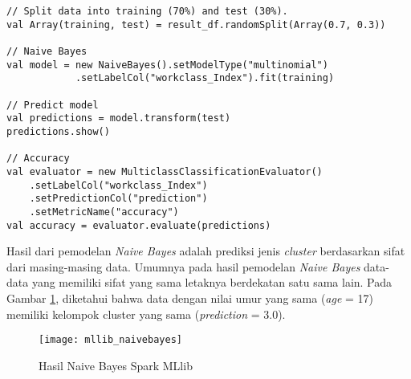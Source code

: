 \begin{lstlisting}[basicstyle=\ttfamily, frame=single,
	columns=fullflexible, keepspaces=true, breaklines=true, label=lst:naivebayes_mllib, caption=Eksperimen Naive Bayes Spark MLlib]
// Split data into training (70%) and test (30%).
val Array(training, test) = result_df.randomSplit(Array(0.7, 0.3))

// Naive Bayes
val model = new NaiveBayes().setModelType("multinomial")
			.setLabelCol("workclass_Index").fit(training)
			
// Predict model
val predictions = model.transform(test)
predictions.show()

// Accuracy
val evaluator = new MulticlassClassificationEvaluator()
	.setLabelCol("workclass_Index")
	.setPredictionCol("prediction")
	.setMetricName("accuracy")
val accuracy = evaluator.evaluate(predictions)

\end{lstlisting}
\newpage
\par Hasil dari pemodelan \textit{Naive Bayes} adalah prediksi jenis \textit{cluster} berdasarkan sifat dari masing-masing data. Umumnya pada hasil pemodelan \textit{Naive Bayes} data-data yang memiliki sifat yang sama letaknya berdekatan satu sama lain. Pada Gambar \ref{fig:mllib_naivebayes}, diketahui bahwa data dengan nilai umur yang sama (\textit{age} = 17) memiliki kelompok cluster yang sama (\textit{prediction} = 3.0).

\begin{figure}[H]
	\centering
	\texttt{[image: mllib\_naivebayes]}
	\caption{Hasil Naive Bayes Spark MLlib}
	\label{fig:mllib_naivebayes}
\end{figure}


